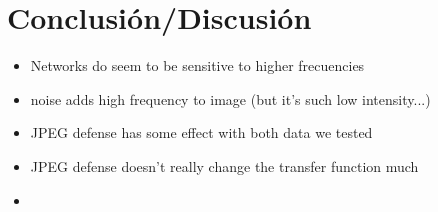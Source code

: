 \section{Conclusión/Discusión}
\begin{itemize}
    \item Networks do seem to be sensitive to higher frecuencies
    \item noise adds high frequency to image (but it's such low intensity...)
    \item JPEG defense has some effect with both data we tested
    \item JPEG defense doesn't really change the transfer function much
    \item 
\end{itemize}